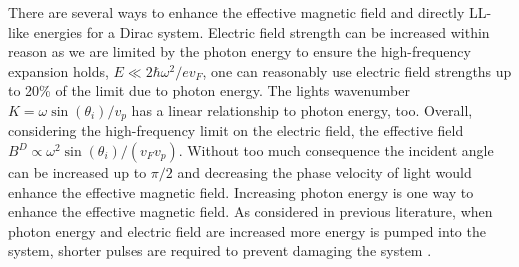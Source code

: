 There are several ways to enhance the effective magnetic field and directly LL-like energies for a Dirac system.
Electric field strength can be increased within reason as we are limited by the photon energy to ensure the high-frequency expansion holds, $E \ll 2\hbar\omega^2/e v_F$, one can reasonably use electric field strengths up to 20\% of the limit due to photon energy.
The lights wavenumber $K= \omega \sin{(\theta_i)} / v_p$ has a linear relationship to photon energy, too.
Overall, considering the high-frequency limit on the electric field, the effective field $B^D \propto \omega^2 \sin{(\theta_i)} / (v_F v_p)$.
Without too much consequence the incident angle can be increased up to $\pi/2$ and decreasing the phase velocity of light would enhance the effective magnetic field.
Increasing photon energy is one way to enhance the effective magnetic field.
As considered in previous literature, when photon energy and electric field are increased more energy is pumped into the system, shorter pulses are required to prevent damaging the system \cite{YHW, JWM}.

